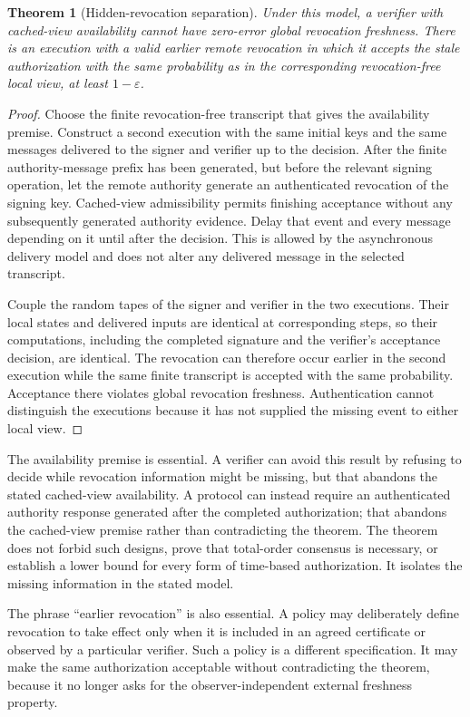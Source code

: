\documentclass[11pt]{article}
\newtheorem{theorem}{Theorem}[section]
\theoremstyle{definition}
\begin{document}
\begin{theorem}[Hidden-revocation separation]\label{thm:hidden}
Under this model, a verifier with cached-view availability cannot have zero-error global revocation freshness. There is an execution with a valid earlier remote revocation in which it accepts the stale authorization with the same probability as in the corresponding revocation-free local view, at least $1-\varepsilon$.
\end{theorem}
\begin{proof}
Choose the finite revocation-free transcript that gives the availability premise. Construct a second execution with the same initial keys and the same messages delivered to the signer and verifier up to the decision. After the finite authority-message prefix has been generated, but before the relevant signing operation, let the remote authority generate an authenticated revocation of the signing key. Cached-view admissibility permits finishing acceptance without any subsequently generated authority evidence. Delay that event and every message depending on it until after the decision. This is allowed by the asynchronous delivery model and does not alter any delivered message in the selected transcript.

Couple the random tapes of the signer and verifier in the two executions. Their local states and delivered inputs are identical at corresponding steps, so their computations, including the completed signature and the verifier's acceptance decision, are identical. The revocation can therefore occur earlier in the second execution while the same finite transcript is accepted with the same probability. Acceptance there violates global revocation freshness. Authentication cannot distinguish the executions because it has not supplied the missing event to either local view.
\end{proof}

The availability premise is essential. A verifier can avoid this result by refusing to decide while revocation information might be missing, but that abandons the stated cached-view availability. A protocol can instead require an authenticated authority response generated after the completed authorization; that abandons the cached-view premise rather than contradicting the theorem. The theorem does not forbid such designs, prove that total-order consensus is necessary, or establish a lower bound for every form of time-based authorization. It isolates the missing information in the stated model.

The phrase ``earlier revocation'' is also essential. A policy may deliberately define revocation to take effect only when it is included in an agreed certificate or observed by a particular verifier. Such a policy is a different specification. It may make the same authorization acceptable without contradicting the theorem, because it no longer asks for the observer-independent external freshness property.
\end{document}
